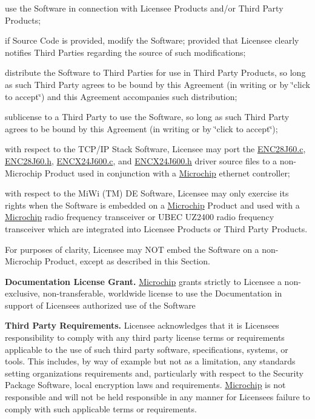 \begin{DoxyEnumerate}
\begin{DoxyEnumerate}
\item use the Software in connection with Licensee Products and/or Third Party Products; 
\item if Source Code is provided, modify the Software; provided that Licensee clearly notifies Third Parties regarding the source of such modifications; 
\item distribute the Software to Third Parties for use in Third Party Products, so long as such Third Party agrees to be bound by this Agreement (in writing or by \char`\"{}click to accept\char`\"{}) and this Agreement accompanies such distribution; 
\item sublicense to a Third Party to use the Software, so long as such Third Party agrees to be bound by this Agreement (in writing or by \char`\"{}click to accept\char`\"{}); 
\item with respect to the T\+C\+P/\+I\+P Stack Software, Licensee may port the \hyperlink{_e_n_c28_j60_8c}{E\+N\+C28\+J60.\+c}, \hyperlink{_e_n_c28_j60_8h}{E\+N\+C28\+J60.\+h}, \hyperlink{_e_n_c_x24_j600_8c}{E\+N\+C\+X24\+J600.\+c}, and \hyperlink{_e_n_c_x24_j600_8h}{E\+N\+C\+X24\+J600.\+h} driver source files to a non-\/\+Microchip Product used in conjunction with a \hyperlink{namespace_microchip}{Microchip} ethernet controller; 
\item with respect to the Mi\+Wi (T\+M) D\+E Software, Licensee may only exercise its rights when the Software is embedded on a \hyperlink{namespace_microchip}{Microchip} Product and used with a \hyperlink{namespace_microchip}{Microchip} radio frequency transceiver or U\+B\+E\+C U\+Z2400 radio frequency transceiver which are integrated into Licensee Products or Third Party Products. 
\end{DoxyEnumerate}

For purposes of clarity, Licensee may N\+O\+T embed the Software on a non-\/\+Microchip Product, except as described in this Section.


\item {\bfseries Documentation License Grant.} \hyperlink{namespace_microchip}{Microchip} grants strictly to Licensee a non-\/exclusive, non-\/transferable, worldwide license to use the Documentation in support of Licensee\textquotesingle{}s authorized use of the Software


\item {\bfseries Third Party Requirements.} Licensee acknowledges that it is Licensee\textquotesingle{}s responsibility to comply with any third party license terms or requirements applicable to the use of such third party software, specifications, systems, or tools. This includes, by way of example but not as a limitation, any standards setting organizations requirements and, particularly with respect to the Security Package Software, local encryption laws and requirements. \hyperlink{namespace_microchip}{Microchip} is not responsible and will not be held responsible in any manner for Licensee\textquotesingle{}s failure to comply with such applicable terms or requirements.



\end{DoxyEnumerate}

